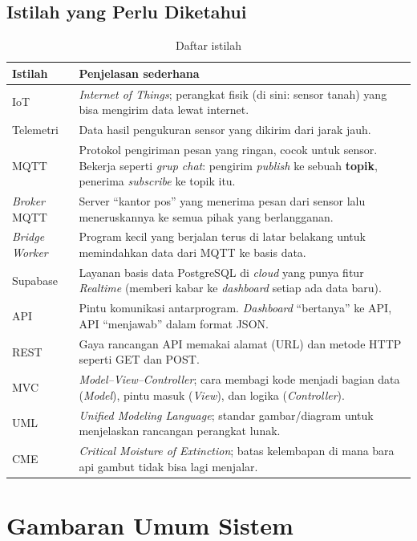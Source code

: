 \documentclass[11pt,a4paper]{article}
\begin{document}
\subsection{Istilah yang Perlu Diketahui}
\begin{table}[H]
\centering
\caption{Daftar istilah}
\label{tab:istilah}
\begin{tabularx}{\linewidth}{@{}lL@{}}
\toprule
\textbf{Istilah} & \textbf{Penjelasan sederhana} \\
\midrule
IoT & \textit{Internet of Things}; perangkat fisik (di sini: sensor tanah) yang bisa mengirim data lewat internet. \\
Telemetri & Data hasil pengukuran sensor yang dikirim dari jarak jauh. \\
MQTT & Protokol pengiriman pesan yang ringan, cocok untuk sensor. Bekerja seperti \textit{grup chat}: pengirim \textit{publish} ke sebuah \textbf{topik}, penerima \textit{subscribe} ke topik itu. \\
\textit{Broker} MQTT & Server ``kantor pos'' yang menerima pesan dari sensor lalu meneruskannya ke semua pihak yang berlangganan. \\
\textit{Bridge Worker} & Program kecil yang berjalan terus di latar belakang untuk memindahkan data dari MQTT ke basis data. \\
Supabase & Layanan basis data PostgreSQL di \textit{cloud} yang punya fitur \textit{Realtime} (memberi kabar ke \textit{dashboard} setiap ada data baru). \\
API & Pintu komunikasi antarprogram. \textit{Dashboard} ``bertanya'' ke API, API ``menjawab'' dalam format JSON. \\
REST & Gaya rancangan API memakai alamat (URL) dan metode HTTP seperti GET dan POST. \\
MVC & \textit{Model--View--Controller}; cara membagi kode menjadi bagian data (\textit{Model}), pintu masuk (\textit{View}), dan logika (\textit{Controller}). \\
UML & \textit{Unified Modeling Language}; standar gambar/diagram untuk menjelaskan rancangan perangkat lunak. \\
CME & \textit{Critical Moisture of Extinction}; batas kelembapan di mana bara api gambut tidak bisa lagi menjalar. \\
\bottomrule
\end{tabularx}
\end{table}

\section{Gambaran Umum Sistem}
\end{document}

